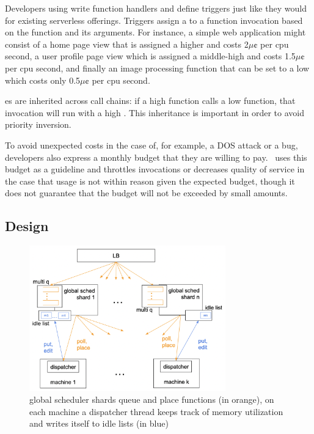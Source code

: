 Developers using \sys{} write function handlers and define triggers just like
they would for existing serverless offerings.  Triggers assign a \priceclass{}
to a function invocation based on the function and its arguments.
For instance, a simple web application might consist of a home page view that is
assigned a higher \priceclass{} and costs 2$\mu\cent$ per cpu second, a user
profile page view which is assigned a middle-high \class{} and costs
1.5$\mu\cent$ per cpu second, and finally an image processing function that can
be set to a low \class{} which costs only 0.5$\mu\cent$ per cpu second.

\Class{}es are inherited across call chains: if a high \class{} function calls a
low \class{} function, that invocation will run with a high \class{}. This
inheritance is important in order to avoid priority inversion.

To avoid unexpected costs in the case of, for example, a DOS attack or a bug,
developers also express a monthly budget that they are willing to pay.~\Sys{}
uses this budget as a guideline and throttles invocations or decreases quality
of service in the case that usage is not within reason given the expected
budget, though it does not guarantee that the budget will not be exceeded by
small amounts.

\subsection{\Sys{} Design}

\begin{figure}[t]
    \centering
      \includegraphics[width=8.5cm]{img/overview.png}
      \caption{ global scheduler shards queue and place functions (in orange),
      on each machine a dispatcher thread keeps track of memory utilization and
      writes itself to idle lists (in blue) }
    \label{fig:overview}
\end{figure}



